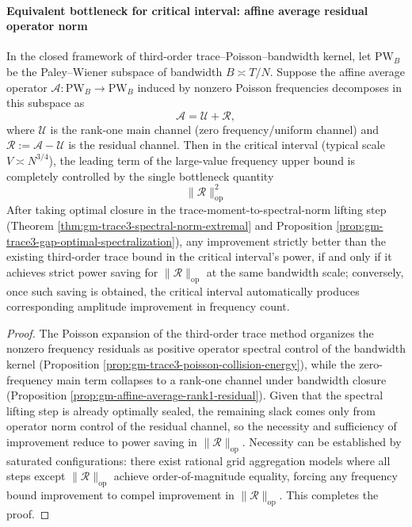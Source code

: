 \paragraph{Equivalent bottleneck for critical interval: affine average residual operator norm}
\begin{theorem}\label{thm:gm-critical-bottleneck-residual-opnorm}
In the closed framework of third-order trace--Poisson--bandwidth kernel, let \(\mathrm{PW}_B\) be the Paley--Wiener subspace of bandwidth \(B\asymp T/N\).
Suppose the affine average operator \(\mathcal{A}:\mathrm{PW}_B\to\mathrm{PW}_B\) induced by nonzero Poisson frequencies decomposes in this subspace as
\[
\mathcal{A}=\mathcal{U}+\mathcal{R},
\]
where \(\mathcal{U}\) is the rank-one main channel (zero frequency/uniform channel) and \(\mathcal{R}:=\mathcal{A}-\mathcal{U}\) is the residual channel.
Then in the critical interval (typical scale \(V\asymp N^{3/4}\)), the leading term of the large-value frequency upper bound is completely controlled by the single bottleneck quantity
\[
\boxed{\ \|\mathcal{R}\|_{\mathrm{op}}^2\ }
\]
After taking optimal closure in the trace-moment-to-spectral-norm lifting step (Theorem \ref{thm:gm-trace3-spectral-norm-extremal} and Proposition \ref{prop:gm-trace3-gap-optimal-spectralization}),
any improvement strictly better than the existing third-order trace bound in the critical interval's power, if and only if it achieves strict power saving for \(\|\mathcal{R}\|_{\mathrm{op}}\) at the same bandwidth scale;
conversely, once such saving is obtained, the critical interval automatically produces corresponding amplitude improvement in frequency count.
\end{theorem}

\begin{proof}
The Poisson expansion of the third-order trace method organizes the nonzero frequency residuals as positive operator spectral control of the bandwidth kernel (Proposition \ref{prop:gm-trace3-poisson-collision-energy}), while the zero-frequency main term collapses to a rank-one channel under bandwidth closure (Proposition \ref{prop:gm-affine-average-rank1-residual}).
Given that the spectral lifting step is already optimally sealed, the remaining slack comes only from operator norm control of the residual channel, so the necessity and sufficiency of improvement reduce to power saving in \(\|\mathcal{R}\|_{\mathrm{op}}\).
Necessity can be established by saturated configurations: there exist rational grid aggregation models where all steps except \(\|\mathcal{R}\|_{\mathrm{op}}\) achieve order-of-magnitude equality, forcing any frequency bound improvement to compel improvement in \(\|\mathcal{R}\|_{\mathrm{op}}\). This completes the proof.
\end{proof}

